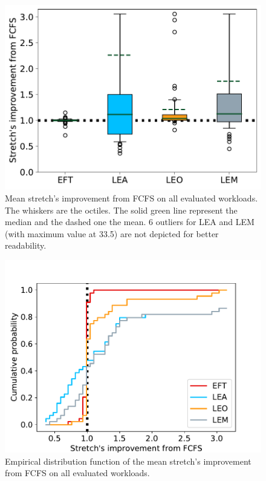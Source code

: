 \documentclass[sigconf,review,anonymous]{acmart}
\begin{document}
\begin{figure}[t]\centering\includegraphics[width=0.9\linewidth]{../MBSS/plot/Boxplot/box_plot_mean_stretch_all_workloads.pdf}\caption{Mean stretch's improvement from FCFS on all evaluated workloads. The whiskers are the octiles. The solid green line represent the median and the dashed one the mean. 6 outliers for LEA and LEM (with maximum value at 33.5) are not depicted for better readability.}\label{boxplot.all}\end{figure}
\begin{figure}[t]\centering\includegraphics[width=0.9\linewidth]{../MBSS/plot/ECDF/ecdf_mean_stretch_all_workloads.pdf}\caption{Empirical distribution function of the mean stretch's improvement from FCFS on all evaluated workloads.}\label{ecdf}\end{figure}
\end{document}
